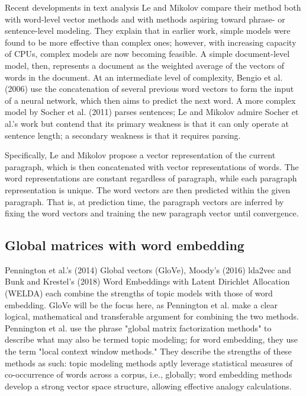 \documentclass[11pt]{article}
\begin{document}
\begin{section}{Recent developments in text analysis }
Le and Mikolov compare their method both with word-level vector methods and with methods aspiring toward phrase- or sentence-level modeling. They explain that in earlier work, simple models were found to be more effective than complex ones; however, with increasing capacity of CPUs, complex models are now becoming feasible. A simple document-level model, then, represents a document as the weighted average of the vectors of words in the document. At an intermediate level of complexity, Bengio et al. (2006) use the concatenation of several previous word vectors to form the input of a neural network, which then aims to predict the next word. A more complex model by Socher et al. (2011) parses sentences; Le and Mikolov admire Socher et al.'s work but contend that its primary weakness is that it can only operate at sentence length; a secondary weakness is that it requires parsing.

Specifically, Le and Mikolov propose a vector representation of the current paragraph, which is then concatenated with vector representations of words. The word representations are constant regardless of paragraph, while each paragraph representation is unique. The word vectors are then predicted within the given paragraph. That is, at prediction time, the paragraph vectors are inferred by fixing the word vectors and training the new paragraph vector until convergence.

\subsection{Global matrices with word embedding}

Pennington et al.'s (2014) Global vectors (GloVe), Moody's (2016) lda2vec and Bunk and Krestel's (2018) Word Embeddings with Latent Dirichlet Allocation (WELDA) each combine the strengths of topic models with those of word embedding. GloVe will be the focus here, as Pennington et al. make a clear logical, mathematical and transferable argument for combining the two methods. Pennington et al. use the phrase "global matrix factorization methods" to describe what may also be termed topic modeling; for word embedding, they use the term "local context window methods." They describe the strengths of these methods as such: topic modeling methods aptly leverage statistical measures of co-occurrence of words across a corpus, i.e., globally; word embedding methods develop a strong vector space structure, allowing effective analogy calculations.


\end{section}
\end{document}
